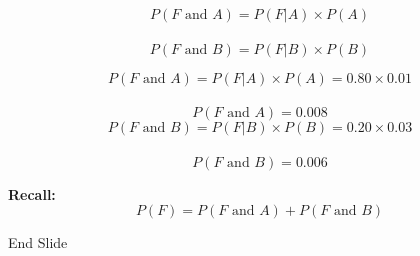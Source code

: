 \documentclass{beamer}
\begin{document}
\begin{frame}
\Large
\vspace{-1.5cm}
\[ P(F \mbox{ and } A) =  P(F|A)\times P(A) \]\\
\vspace{1.7cm}
\[ P(F \mbox{ and } B) =  P(F|B)\times P(B) \]
\end{frame}

\begin{frame}
\Large
\[ P(F \mbox{ and } A) =  P(F|A)\times P(A) = 0.80 \times 0.01\]\\
\[ P(F \mbox{ and } A) = 0.008\]
\bigskip
\[ P(F \mbox{ and } B) =  P(F|B)\times P(B) = 0.20 \times 0.03\]\\
\[ P(F \mbox{ and } B) = 0.006\]
\end{frame}

\begin{frame}
\Large
\vspace{-3cm}
\textbf{Recall:}
\[ P(F) = P(F \mbox{ and } A) + P(F \mbox{ and } B) \]

\end{frame}

\begin{frame}
\LARGE
End Slide
\end{frame}
\end{document}
